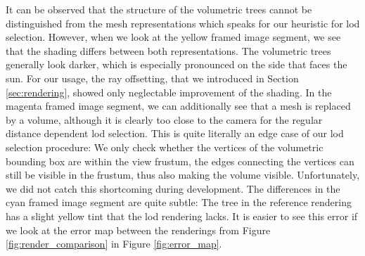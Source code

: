It can be observed that the structure of the volumetric trees cannot be distinguished from the mesh representations which speaks for our heuristic for \ac{lod} selection.
However, when we look at the yellow framed image segment, we see that the shading differs between both representations.
The volumetric trees generally look darker, which is especially pronounced on the side that faces the sun.
For our usage, the ray offsetting, that we introduced in Section \ref{sec:rendering}, showed only neglectable improvement of the shading.
In the magenta framed image segment, we can additionally see that a mesh is replaced by a volume, although it is clearly too close to the camera for the regular distance dependent \ac{lod} selection.
This is quite literally an edge case of our \ac{lod} selection procedure: We only check whether the vertices of the volumetric bounding box are within the view frustum, the edges connecting the vertices can still be visible in the frustum, thus also making the volume visible.
Unfortunately, we did not catch this shortcoming during development.
The differences in the cyan framed image segment are quite subtle: The tree in the reference rendering has a slight yellow tint that the \ac{lod} rendering lacks.
It is easier to see this error if we look at the \FLIP error map between the renderings from Figure \ref{fig:render_comparison} in Figure \ref{fig:error_map}.
